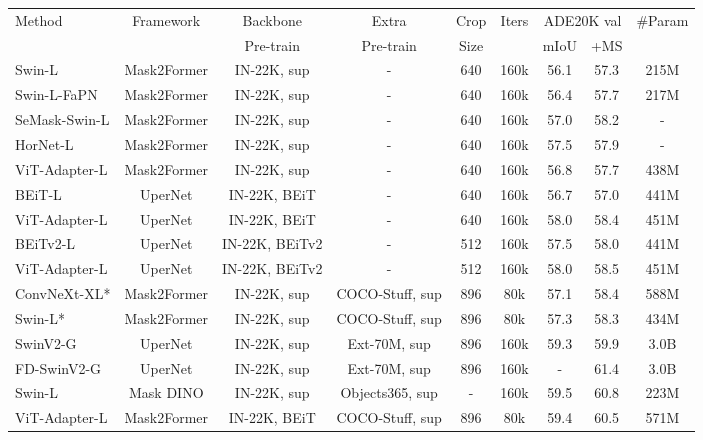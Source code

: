 \documentclass{article} \usepackage{iclr2023_conference,times}
\begin{document}
\begin{table}[t]\small
	\centering
	\renewcommand\arraystretch{1.0}
    \setlength\tabcolsep{0.40mm}
    \begin{tabular}{l|c|c|c|c|c|cc|c}
        \toprule
        \multirow{2}{*}{Method} & \multirow{2}{*}{Framework} & Backbone & Extra & Crop & \multirow{2}{*}{Iters} & \multicolumn{2}{c|}{ADE20K val} & \multirow{2}{*}{\#Param}\\
        & & Pre-train & Pre-train& Size & & mIoU & +MS & \\
        \midrule
        Swin-L & Mask2Former & IN-22K, sup & - & 640 & 160k & 56.1 & 57.3 & 215M\\
        Swin-L-FaPN & Mask2Former & IN-22K, sup & -& 640 & 160k & 56.4 & 57.7 & 217M\\
        SeMask-Swin-L & Mask2Former & IN-22K, sup & -& 640 & 160k & 57.0 & 58.2 & -\\
        HorNet-L & Mask2Former & IN-22K, sup & -& 640 & 160k & 57.5 & 57.9 & -\\
\rowcolor{gray!20} 
        ViT-Adapter-L & Mask2Former & IN-22K, sup & - & 640 & 160k & 56.8 & 57.7 & 438M \\
        \midrule
	    BEiT-L & UperNet & IN-22K, BEiT & - & 640 & 160k & 56.7 & 57.0 & 441M\\
	    \rowcolor{gray!20} 
	    ViT-Adapter-L &
	    UperNet & IN-22K, BEiT & - & 640 & 160k & 58.0 & 58.4 & 451M\\
BEiTv2-L & UperNet & IN-22K, BEiTv2 & - & 512 & 160k & 57.5 & 58.0 & 441M\\
	    \rowcolor{gray!20} 
	    ViT-Adapter-L &
	    UperNet & IN-22K, BEiTv2 & - & 512 & 160k & 58.0 & 58.5  & 451M\\
\midrule
	   ConvNeXt-XL* & Mask2Former & IN-22K, sup & COCO-Stuff, sup & 896 & 80k & 57.1 & 58.4 & 588M \\
	   Swin-L* & Mask2Former & IN-22K, sup & COCO-Stuff, sup & 896  & 80k & 57.3 & 58.3 & 434M \\
	   SwinV2-G & UperNet & IN-22K, sup & Ext-70M, sup & 896 & 160k & 59.3 & 59.9 & 3.0B \\
	   FD-SwinV2-G & UperNet & IN-22K, sup & Ext-70M, sup & 896 & 160k & - & 61.4 & 3.0B \\
	   Swin-L & Mask DINO & IN-22K, sup & Objects365, sup & - & 160k &59.5 & 60.8 & 223M  \\
	    \rowcolor{gray!20} 
	    ViT-Adapter-L & Mask2Former &IN-22K, BEiT & COCO-Stuff, sup & 896 & 80k & 59.4 & 60.5 & 571M\\

\end{tabular}
\end{table}
\end{document}
